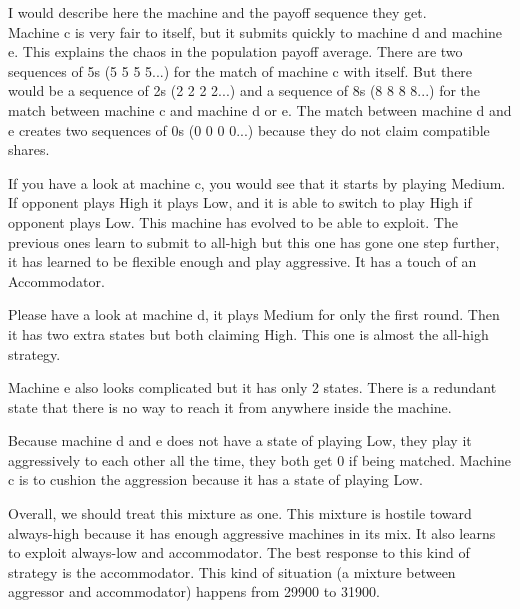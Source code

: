 \documentclass[12.5pt]{report}
\begin{document}
I would describe here the machine and the payoff sequence they get. \\

Machine c is very fair to itself, but it submits quickly to machine d and machine e. This explains the chaos in the population payoff average. There are two sequences of 5s (5 5 5 5...) for the match of machine c with itself. But there would be a sequence of 2s (2 2 2 2...) and a sequence of 8s (8 8 8 8...) for the match between machine c and machine d or e. The match between machine d and e creates two sequences of 0s (0 0 0 0...) because they do not claim compatible shares.

If you have a look at machine c, you would see that it starts by playing Medium. If opponent plays High it plays Low, and it is able to switch to play High if opponent plays Low. This machine has evolved to be able to exploit. The previous ones learn to submit to all-high but this one has gone one step further, it has learned to be flexible enough and play aggressive. It has a touch of an Accommodator.

Please have a look at machine d, it plays Medium for only the first round. Then it has two extra states but both claiming High. This one is almost the all-high strategy.

Machine e also looks complicated but it has only 2 states. There is a redundant state that there is no way to reach it from anywhere inside the machine.

Because machine d and e does not have a state of playing Low, they play it aggressively to each other all the time, they both get 0 if being matched. Machine c is to cushion the aggression because it has a state of playing Low.

Overall, we should treat this mixture as one. This mixture is hostile toward always-high because it has enough aggressive machines in its mix. It also learns to exploit always-low and accommodator. The best response to this kind of strategy is the accommodator. This kind of situation (a mixture between aggressor and accommodator) happens from 29900 to 31900.
\end{document}
